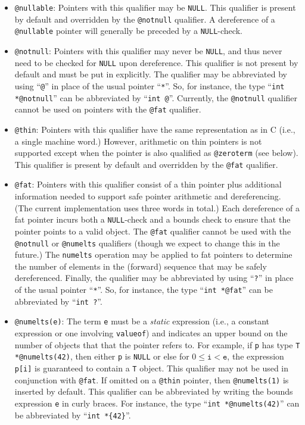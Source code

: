 \begin{itemize}
\item \texttt{@nullable}:  Pointers with this qualifier may be \texttt{NULL}.
This qualifier is present by default and overridden by the \texttt{@notnull}
qualifier.  A dereference of a \texttt{@nullable} pointer will generally
be preceded by a \texttt{NULL}-check.  

\item \texttt{@notnull}:  Pointers with this qualifier may never be 
\texttt{NULL}, and thus never need to be checked for \texttt{NULL}
upon dereference.  This qualifier is not present by default and must be
put in explicitly.  The qualifier may be abbreviated by using ``\texttt{@}''
in place of the usual pointer ``\texttt{*}''.  So, for instance,
the type ``\texttt{int *@notnull}'' can be abbreviated by 
``\texttt{int @}''.  Currently, the \texttt{@notnull} qualifier cannot be 
used on pointers with the \texttt{@fat} qualifier.  

\item \texttt{@thin}:  Pointers with this qualifier have the same
representation as in C (i.e., a single machine word.)  However,
arithmetic on thin pointers is not supported except when the
pointer is also qualified as \texttt{@zeroterm} (see below).  
This qualifier is present by default and overridden by the \texttt{@fat} 
qualifier.

\item \texttt{@fat}:  Pointers with this qualifier consist of a
thin pointer plus additional information needed to support safe
pointer arithmetic and dereferencing.  (The current implementation
uses three words in total.)  Each dereference of a fat
pointer incurs both a \texttt{NULL}-check and a bounds check to
ensure that the pointer points to a valid object.  The 
\texttt{@fat} qualifier
cannot be used with the \texttt{@notnull} or \texttt{@numelts}
qualifiers (though we expect to change this in the future.)  
The \texttt{numelts} operation may be applied to fat pointers to
determine the number of elements in the (forward) sequence that
may be safely dereferenced.  Finally, the qualifier may be 
abbreviated by using ``\texttt{?}''
in place of the usual pointer ``\texttt{*}''.  So, for instance,
the type ``\texttt{int *@fat}'' can be abbreviated by 
``\texttt{int ?}''.  

\item \texttt{@numelts(e)}:  The term \texttt{e} must be a \emph{static}
expression (i.e., a constant expression or one involving \texttt{valueof})
and indicates an upper bound on the number of objects that
that the pointer refers to.  For example, if \texttt{p} has type
\texttt{T *@numelts(42)}, then either \texttt{p} is \texttt{NULL}
or else for $0 \leq \texttt{i} < \texttt{e}$, the expression 
\texttt{p[i]} is guaranteed to
contain a \texttt{T} object.  This qualifier may not be used 
in conjunction with \texttt{@fat}.  If omitted on a \texttt{@thin}
pointer, then \texttt{@numelts(1)} is inserted by default.  This
qualifier can be abbreviated by writing the bounds expression \texttt{e}
in curly braces.  For instance, the type ``\texttt{int *@numelts(42)}''
can be abbreviated by ``\texttt{int *\{42\}}''.


\end{itemize}

